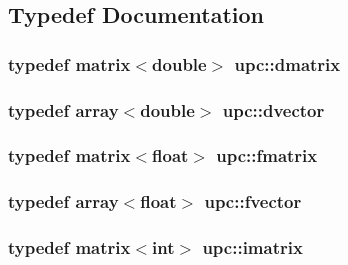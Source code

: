 \subsection{Typedef Documentation}
\subsubsection[{\texorpdfstring{dmatrix}{dmatrix}}]{\setlength{\rightskip}{0pt plus 5cm}typedef {\bf matrix}$<$double$>$ {\bf upc\+::dmatrix}}\hypertarget{namespaceupc_a53f2db863d6ef79ba43159171dce9612}{}\label{namespaceupc_a53f2db863d6ef79ba43159171dce9612}
\subsubsection[{\texorpdfstring{dvector}{dvector}}]{\setlength{\rightskip}{0pt plus 5cm}typedef {\bf array}$<$double$>$ {\bf upc\+::dvector}}\hypertarget{namespaceupc_a226c72b20137fbf8cc10b0c0ca887b5d}{}\label{namespaceupc_a226c72b20137fbf8cc10b0c0ca887b5d}
\subsubsection[{\texorpdfstring{fmatrix}{fmatrix}}]{\setlength{\rightskip}{0pt plus 5cm}typedef {\bf matrix}$<${\bf float}$>$ {\bf upc\+::fmatrix}}\hypertarget{namespaceupc_a9f26dfcf21c4c5cee20f5733be78ba11}{}\label{namespaceupc_a9f26dfcf21c4c5cee20f5733be78ba11}
\subsubsection[{\texorpdfstring{fvector}{fvector}}]{\setlength{\rightskip}{0pt plus 5cm}typedef {\bf array}$<${\bf float}$>$ {\bf upc\+::fvector}}\hypertarget{namespaceupc_a12a5d4885a36892c03181736f8b3089c}{}\label{namespaceupc_a12a5d4885a36892c03181736f8b3089c}
\subsubsection[{\texorpdfstring{imatrix}{imatrix}}]{\setlength{\rightskip}{0pt plus 5cm}typedef {\bf matrix}$<$int$>$ {\bf upc\+::imatrix}}\hypertarget{namespaceupc_a6bb820f56fc4cc2c976ac0ceeaa8e611}{}\label{namespaceupc_a6bb820f56fc4cc2c976ac0ceeaa8e611}
